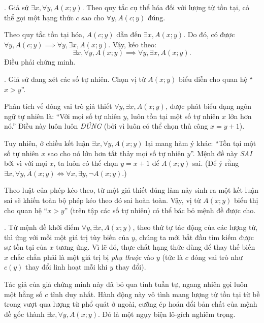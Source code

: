 \solution

\setcounter{subexercise}{1}
. Giả sử $\exists x, \forall y, A(x; y)$. Theo quy tắc cụ thể hóa đối với lượng từ tồn tại, có thể gọi một hạng thức $c$ sao cho $\forall y, A(c; y)$ đúng.

Theo quy tắc tồn tại hóa, $A(c; y)$ dẫn đến $\exists x, A(x; y)$. Do đó, có được $\forall y, A(c; y) \implies \forall y, \exists x, A(x; y)$. Vậy, kéo theo:
\begin{equation*}
    \exists x, \forall y, A(x; y) \implies \forall y, \exists x, A(x; y).
\end{equation*}
Điều phải chứng minh.

. Giả sử đang xét các số tự nhiên. Chọn vị từ $A(x; y)$ biểu diễn cho quan hệ ``$x > y$''.

Phân tích vế đóng vai trò giả thiết $\forall y, \exists x, A(x; y)$, được phát biểu dạng ngôn ngữ tự nhiên là: ``Với mọi số tự nhiên $y$, luôn tồn tại một số tự nhiên $x$ lớn hơn nó.'' Điều này luôn luôn \emph{ĐÚNG} (bởi vì luôn có thể chọn thủ công $x = y + 1$).

Tuy nhiên, ở chiều kết luận $\exists x, \forall y, A(x; y)$ lại mang hàm ý khác: ``Tồn tại một số tự nhiên $x$ sao cho nó lớn hơn tất thảy mọi số tự nhiên $y$''. Mệnh đề này \emph{SAI} bởi vì với mọi $x$, ta luôn có thể chọn $y = x + 1$ để $A(x; y)$ sai. (Để ý rằng $\overline{\exists x, \forall y, A(x; y)} \iff \forall x, \exists y, \neg A(x; y)$.)

Theo luật của phép kéo theo, từ một giả thiết đúng làm nảy sinh ra một kết luận sai sẽ khiến toàn bộ phép kéo theo đó sai hoàn toàn. Vậy, vị từ $A(x; y)$ biểu thị cho quan hệ ``$x > y$'' (trên tập các số tự nhiên) có thể bác bỏ mệnh đề được cho.

. Từ mệnh đề khởi điểm $\forall y, \exists x, A(x; y)$, theo thứ tự tác động của các lượng từ, thì ứng với mỗi một giá trị tùy biến của $y$, chúng ta mới bắt đầu tìm kiếm được sự tồn tại của $x$ tương ứng. Vì lẽ đó, thực chất hạng thức dùng để thay thế biến $x$ chắc chắn phải là một giá trị bị \emph{phụ thuộc} vào $y$ (tức là $c$ đóng vai trò như $c(y)$ thay đổi linh hoạt mỗi khi $y$ thay đổi).

Tác giả của giả chứng minh này đã bỏ qua tính tuần tự, ngang nhiên gọi luôn một hằng số $c$ tĩnh duy nhất. Hành động này vô tình mang lượng từ tồn tại từ bề trong vượt qua lượng từ phổ quát ở ngoài, cưỡng ép hoán đổi bản chất của mệnh đề gốc thành $\exists x, \forall y, A(x; y)$. Đó là một ngụy biện lô-gích nghiêm trọng.
